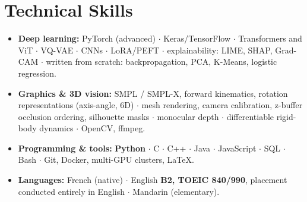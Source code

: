 \documentclass[10pt, letterpaper]{article}
\begin{document}
\section{Technical Skills}
\begin{itemize}
    \item \textbf{Deep learning:} PyTorch (advanced) $\cdot$ Keras/TensorFlow $\cdot$ Transformers and ViT $\cdot$ VQ-VAE $\cdot$ CNNs $\cdot$ LoRA/PEFT $\cdot$ explainability: LIME, SHAP, Grad-CAM $\cdot$ written from scratch: backpropagation, PCA, K-Means, logistic regression.
    \item \textbf{Graphics \& 3D vision:} SMPL / SMPL-X, forward kinematics, rotation representations (axis-angle, 6D) $\cdot$ mesh rendering, camera calibration, z-buffer occlusion ordering, silhouette masks $\cdot$ monocular depth $\cdot$ differentiable rigid-body dynamics $\cdot$ OpenCV, ffmpeg.
    \item \textbf{Programming \& tools:} \textbf{Python} $\cdot$ C $\cdot$ C++ $\cdot$ Java $\cdot$ JavaScript $\cdot$ SQL $\cdot$ Bash $\cdot$ Git, Docker, multi-GPU clusters, \LaTeX{}.
    \item \textbf{Languages:} French (native) $\cdot$ English \textbf{B2, TOEIC 840/990}, placement conducted entirely in English $\cdot$ Mandarin (elementary).
\end{itemize}
\end{document}

